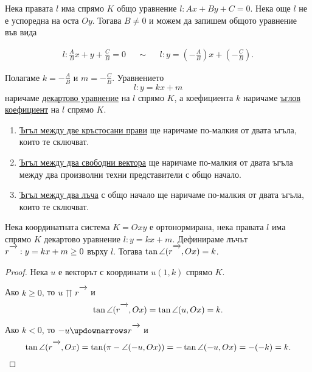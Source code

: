 \documentclass[numbers=endperiod, DIV=15]{scrartcl}
\begin{document}
\begin{definition}
  Нека правата $l$ има спрямо $K$ общо уравнение $l: Ax + By + C = 0$. Нека още $l$ не е успоредна на оста $Oy$. Тогава $B \neq 0$ и можем да запишем общото уравнение във вида

  \begin{align*}
    l: \frac A B x + y + \frac C B = 0
    &&\sim&&
    l: y = \left(-\frac A B \right) x + \left(-\frac C B \right).
  \end{align*}

  Полагаме $k = -\frac A B$ и $m = -\frac C B$. Уравнението
  \begin{displaymath}
    l: y = kx + m
  \end{displaymath}
  наричаме \underline{декартово уравнение} на $l$ спрямо $K$, а коефициента $k$ наричаме \underline{ъглов коефициент} на $l$ спрямо $K$.
\end{definition}

\begin{definition}
  \mbox{}
  \begin{enumerate}
    \item \underline{Ъгъл между две кръстосани прави} ще наричаме по-малкия от двата ъгъла, които те сключват.
    \item \underline{Ъгъл между два свободни вектора} ще наричаме по-малкия от двата ъгъла между два произволни техни представители с общо начало.
    \item \underline{Ъгъл между два лъча} с общо начало ще наричаме по-малкия от двата ъгъла, които те сключват.
  \end{enumerate}
\end{definition}

\begin{proposition}
  Нека координатната система $K = Oxy$ е ортонормирана, нека правата $l$ има спрямо $K$ декартово уравнение $l: y = kx + m$. Дефинираме лъчът $r\Ray : y = kx + m \geq 0$ върху $l$. Тогава $\tan \angle(r\Ray, Ox) = k$.
\end{proposition}
\begin{proof}
  Нека $u$ е векторът с координати $u(1, k)$ спрямо $K$.

  Ако $k \geq 0$, то $u \upuparrows r\Ray$ и
  \begin{displaymath}
     \tan \angle(r\Ray, Ox) = \tan \angle(u, Ox) = k.
  \end{displaymath}

  Ако $k < 0$, то $-u \updownarrows r\Ray$ и
  \begin{displaymath}
    \tan \angle(r\Ray, Ox) = \tan(\pi - \angle(-u, Ox)) = -\tan \angle(-u, Ox) = -(-k) = k.
  \end{displaymath}
\end{proof}
\end{document}
